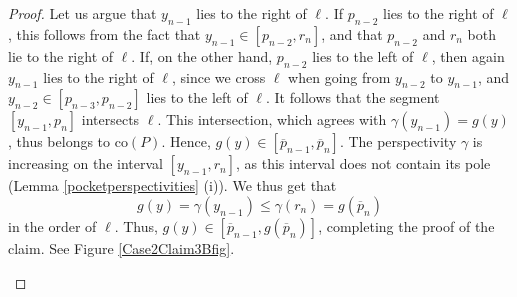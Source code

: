 \documentclass[11pt]{amsart}
\theoremstyle{remark}
\numberwithin{equation}{section}
\newcommand{\co}{\mathrm{co}}
\renewcommand{\leq}{\leqslant}
\begin{document}
\begin{proof}
Let us argue that $y_{n-1}$ lies to the right of $\ell$. If 
$p_{n-2}$ lies to the right of $\ell$, this follows from the fact that $y_{n-1}\in [p_{n-2},r_n]$, and that $p_{n-2}$ and $r_n$
both lie to the right of $\ell$. If, on the other hand, $p_{n-2}$ lies to the left of $\ell$, then again  $y_{n-1}$ lies to the right of $\ell$,
 since we cross $\ell$ when going from $y_{n-2}$ to $y_{n-1}$, and $y_{n-2}\in [p_{n-3},p_{n-2}]$ lies to the left of $\ell$.   It follows that the segment $[y_{n-1},p_n]$ intersects $\ell$. This intersection, which agrees with   $\gamma(y_{n-1})=g(y)$,  thus belongs to  $\co(P)$. Hence, $g(y)\in [\overline p_{n-1},\overline p_n]$. The perspectivity $\gamma$ is increasing on the interval $[y_{n-1},r_n]$, as this interval does not contain its pole (Lemma \ref{pocketperspectivities} (i)).
We thus get that  
\[
g(y)=\gamma(y_{n-1})\leq \gamma(r_n)=g(\overline p_n)
\] 
in the order of $\ell$. Thus,  $g(y)\in [\overline p_{n-1},g(\overline p_n)]$, completing the proof of the claim. 
See Figure \ref{Case2Claim3Bfig}.

\begin{figure}[h]
\centering

\end{figure}
\end{proof}
\end{document}
